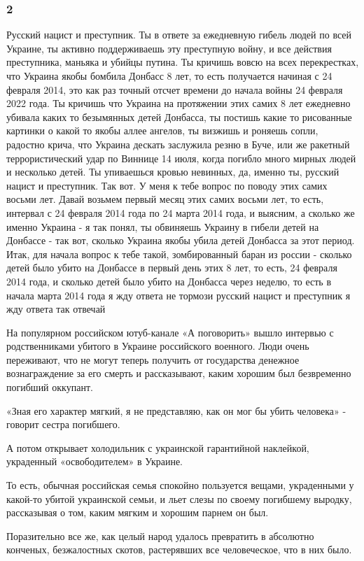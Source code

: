  
 
 
 
 

\subsubsection{2}

Русский нацист и преступник. Ты в ответе за ежедневную гибель людей по всей
Украине, ты активно поддерживаешь эту преступную войну, и все действия
преступника, маньяка и убийцы путина.  Ты кричишь вовсю на всех перекрестках,
что Украина якобы бомбила Донбасс 8 лет, то есть получается начиная с 24
февраля 2014, это как раз точный отсчет времени до начала войны 24 февраля 2022
года. Ты кричишь что Украина на протяжении этих самих 8 лет ежедневно убивала
каких то безымянных детей Донбасса, ты постишь какие то рисованные картинки о
какой то якобы аллее ангелов, ты визжишь и роняешь сопли, радостно крича, что
Украина дескать заслужила резню в Буче, или же ракетный террористический удар
по Виннице 14 июля, когда погибло много мирных людей и несколько детей. Ты
упиваешься кровью невинных, да, именно ты, русский нацист и преступник. Так
вот. У меня к тебе вопрос по поводу этих самих восьми лет.  Давай возьмем
первый месяц этих самих восьми лет, то есть, интервал с 24 февраля 2014 года по
24 марта 2014 года, и выясним, а сколько же именно Украина - я так понял, ты
обвиняешь Украину в гибели детей на Донбассе - так вот, сколько Украина якобы
убила детей Донбасса за этот период. Итак, для начала вопрос к тебе такой,
зомбированный баран из россии - сколько детей было убито на Донбассе в первый
день этих 8 лет, то есть, 24 февраля 2014 года, и сколько детей было убито на
Донбасса через неделю, то есть в начала марта 2014 года я жду ответа не тормози
русский нацист и преступник я жду ответа так отвечай


На популярном российском ютуб-канале «А поговорить» вышло интервью с
родственниками убитого в Украине российского военного. Люди очень переживают,
что не могут теперь получить от государства денежное вознаграждение за его
смерть и рассказывают, каким хорошим был безвременно погибший оккупант.

«Зная его характер мягкий, я не представляю, как он мог бы убить человека» -
говорит сестра погибшего.

А потом открывает холодильник с украинской гарантийной наклейкой, украденный
«освободителем» в Украине.

То есть, обычная российская семья спокойно пользуется вещами, украденными у
какой-то убитой украинской семьи, и льет слезы по своему погибшему выродку,
рассказывая о том, каким мягким и хорошим парнем он был.

Поразительно все же, как целый народ удалось превратить в абсолютно конченых,
безжалостных скотов, растерявших все человеческое, что в них было.
